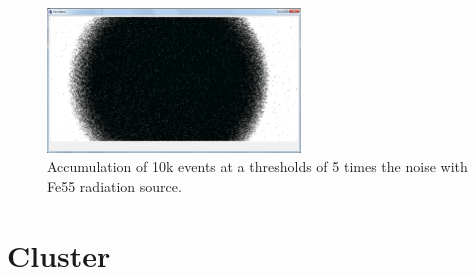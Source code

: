   \begin{figure}
    \centering
    \includegraphics[width=0.6\textwidth]{Pictures/labTests/10kEvents_Fe55_cut5sigma.png}
    \caption{Accumulation of 10k events at a thresholds of 5 times the noise with Fe55 radiation source.}
  \end{figure}

  \begin{figure}
  \end{figure}

\section{Cluster}

  \begin{figure}
  \end{figure}
